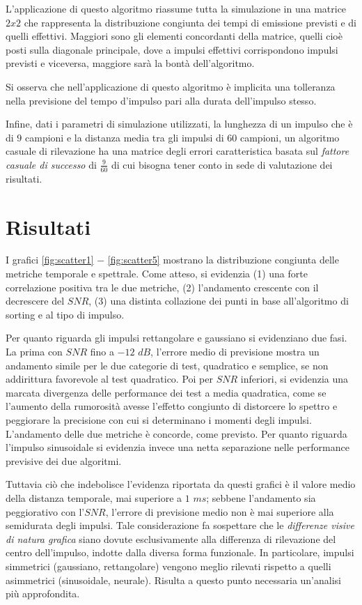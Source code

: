 \documentclass[9pt,twocolumn,twoside]{osajnl}
\begin{document}
L'applicazione di questo algoritmo riassume tutta la simulazione in una matrice $2x2$ che rappresenta la distribuzione congiunta dei tempi di emissione previsti e di quelli effettivi. Maggiori sono gli elementi concordanti della matrice, quelli cioè posti sulla diagonale principale, dove a impulsi effettivi corrispondono impulsi previsti e viceversa, maggiore sarà la bontà dell'algoritmo.

Si osserva che nell'applicazione di questo algoritmo è implicita una tolleranza nella previsione del tempo d'impulso pari alla durata dell'impulso stesso.

Infine, dati i parametri di simulazione utilizzati, la lunghezza di un impulso che è di $9$ campioni e la distanza media tra gli impulsi di $60$ campioni, un algoritmo casuale di rilevazione ha una matrice degli errori caratteristica basata sul {\it fattore casuale di successo} di $\frac{9}{60}$ di cui bisogna tener conto in sede di valutazione dei risultati. 



\section{Risultati}
\label{risultati}

I grafici \ref{fig:scatter1} $-$ \ref{fig:scatter5} mostrano la distribuzione congiunta delle metriche temporale e spettrale. Come atteso, si evidenzia (1) una forte correlazione positiva tra le due metriche, (2) l'andamento crescente con il decrescere del $SNR$, (3) una distinta collazione dei punti in base all'algoritmo di sorting e al tipo di impulso.

Per quanto riguarda gli impulsi rettangolare e gaussiano si evidenziano due fasi. La prima con $SNR$ fino a $-12$ $dB$, l'errore medio di previsione mostra un andamento simile per le due categorie di test, quadratico e semplice, se non addirittura favorevole al test quadratico. Poi per $SNR$ inferiori, si evidenzia una marcata divergenza delle performance dei test a media quadratica, come se l'aumento della rumorosità avesse l'effetto congiunto di distorcere lo spettro e peggiorare la precisione con cui si determinano i momenti degli impulsi. L'andamento delle due metriche è concorde, come previsto. Per quanto riguarda l'impulso sinusoidale si evidenzia invece una netta separazione nelle performance previsive dei due algoritmi.

Tuttavia ciò che indebolisce l'evidenza riportata da questi grafici è il valore medio della distanza temporale, mai superiore a $1$ $ms$; sebbene l'andamento sia peggiorativo con l'$SNR$, l'errore di previsione medio non è mai superiore alla semidurata degli impulsi. Tale considerazione fa sospettare che le {\it differenze visive di natura grafica} siano dovute esclusivamente alla differenza di rilevazione del centro dell'impulso, indotte dalla diversa forma funzionale. In particolare, impulsi simmetrici (gaussiano, rettangolare) vengono meglio rilevati rispetto a quelli asimmetrici (sinusoidale, neurale). Risulta a questo punto necessaria un'analisi più approfondita.
\end{document}

